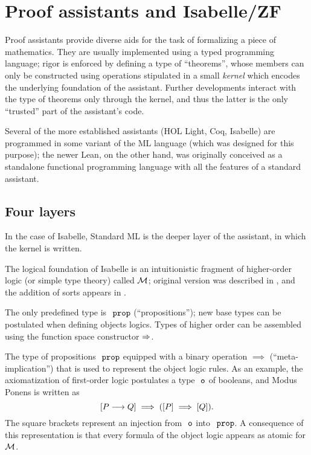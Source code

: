 \section{Proof assistants and Isabelle/ZF}
\label{sec:proof-assist-isabelle}

Proof assistants provide diverse aids for the task
of formalizing a piece of mathematics. They are usually implemented
using a typed programming language; rigor is enforced by defining a
type of ``theorems'', whose members can only be constructed using
operations stipulated in a small \emph{kernel} which encodes the
underlying foundation of the assistant. Further developments interact
with the type of theorems only through the kernel, and thus the latter
is the only ``trusted'' part of the assistant's code.

Several of the more established assistants (HOL Light, Coq, Isabelle)
are programmed in some variant of the ML language (which was
designed for this purpose); the newer Lean, on the other
hand, was originally conceived as a standalone functional programming
language with all the features of a standard assistant.

\subsection{Four layers}

In the case of Isabelle, Standard ML is the deeper layer of the
assistant, in which the kernel is written.

The logical foundation of Isabelle is an intuitionistic fragment of
higher-order logic (or simple type theory) called $\mathcal{M}$;
original version was described in \cite{Paulson1989}, and the addition
of  sorts appears in \cite{Nipkow-LF-91}.

The only predefined type is $\prop$ (“propositions”); new base types
can be postulated when defining objects logics. Types of higher order can be
assembled using the function space constructor $\Rightarrow$.

The type of propositions $\prop$ equipped with a binary operation
$\implies$ (“meta-implication”) that is used to represent the object
logic rules. As an example, the axiomatization of first-order logic
postulates a type $\tyo$ of booleans, and Modus Ponens
is written as
\[
  [P\longrightarrow Q] \implies ([P] \implies [Q]).
\]
The square brackets represent an injection from $\tyo$ into
$\prop$. %
A consequence of this representation is that every
formula of the object logic appears as atomic for $\mathcal{M}$.


